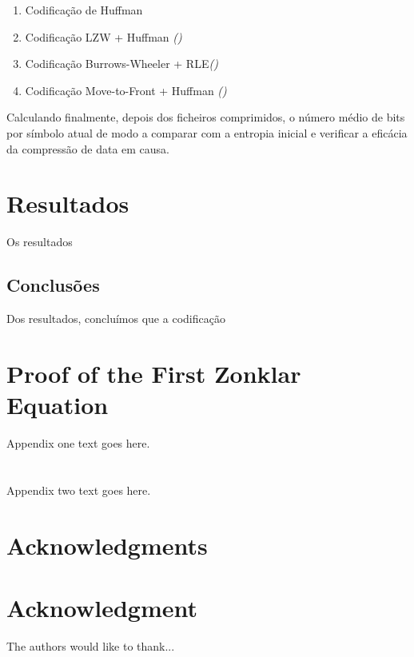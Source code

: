 \documentclass[11pt,journal,compsoc]{IEEEtran}
\begin{document}
\begin{enumerate}
    \item Codificação de Huffman
    \item Codificação LZW + Huffman \textit{()}
    \item Codificação Burrows-Wheeler + RLE\textit{()}
    \item Codificação Move-to-Front + Huffman \textit{()}
\end{enumerate}


Calculando finalmente, depois dos ficheiros comprimidos, o número médio de bits por símbolo atual de modo a comparar com a entropia inicial e verificar a eficácia da compressão de data em causa.

\section{Resultados} %
Os resultados 



\subsection{Conclusões}
Dos resultados, concluímos que a codificação



\appendices
\section{Proof of the First Zonklar Equation}
Appendix one text goes here.

\section{}
Appendix two text goes here.


\ifCLASSOPTIONcompsoc
  \section*{Acknowledgments}
\else
  \section*{Acknowledgment}
\fi

The authors would like to thank...

\ifCLASSOPTIONcaptionsoff
  \newpage
\fi


\footnotemark 


\end{document}
